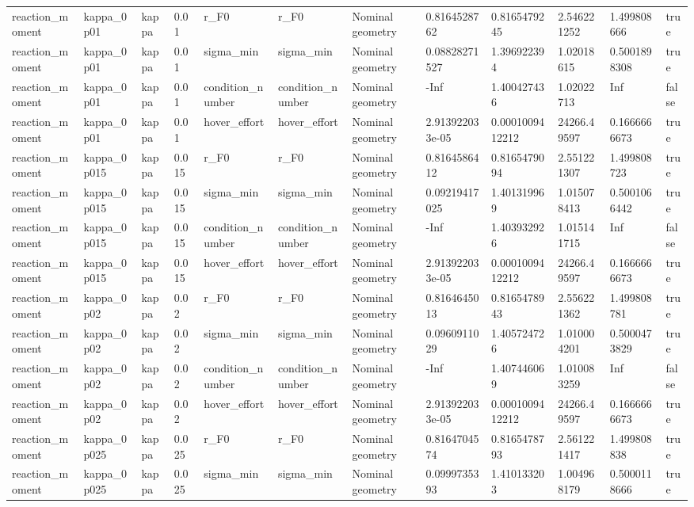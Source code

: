 \begin{tabular}{@{}llllllllllll@{}}
reaction\_moment & kappa\_0p01 & kappa & 0.01 & r\_F0 & r\_F0 & Nominal geometry & 0.8164528762 & 0.8165479245 & 2.546221252 & 1.499808666 & true \\
reaction\_moment & kappa\_0p01 & kappa & 0.01 & sigma\_min & sigma\_min & Nominal geometry & 0.08828271527 & 1.396922394 & 1.02018615 & 0.5001898308 & true \\
reaction\_moment & kappa\_0p01 & kappa & 0.01 & condition\_number & condition\_number & Nominal geometry & -Inf & 1.400427436 & 1.02022713 & Inf & false \\
reaction\_moment & kappa\_0p01 & kappa & 0.01 & hover\_effort & hover\_effort & Nominal geometry & 2.913922033e-05 & 0.0001009412212 & 24266.49597 & 0.1666666673 & true \\
reaction\_moment & kappa\_0p015 & kappa & 0.015 & r\_F0 & r\_F0 & Nominal geometry & 0.8164586412 & 0.8165479094 & 2.551221307 & 1.499808723 & true \\
reaction\_moment & kappa\_0p015 & kappa & 0.015 & sigma\_min & sigma\_min & Nominal geometry & 0.09219417025 & 1.401319969 & 1.015078413 & 0.5001066442 & true \\
reaction\_moment & kappa\_0p015 & kappa & 0.015 & condition\_number & condition\_number & Nominal geometry & -Inf & 1.403932926 & 1.015141715 & Inf & false \\
reaction\_moment & kappa\_0p015 & kappa & 0.015 & hover\_effort & hover\_effort & Nominal geometry & 2.913922033e-05 & 0.0001009412212 & 24266.49597 & 0.1666666673 & true \\
reaction\_moment & kappa\_0p02 & kappa & 0.02 & r\_F0 & r\_F0 & Nominal geometry & 0.8164645013 & 0.8165478943 & 2.556221362 & 1.499808781 & true \\
reaction\_moment & kappa\_0p02 & kappa & 0.02 & sigma\_min & sigma\_min & Nominal geometry & 0.0960911029 & 1.405724726 & 1.010004201 & 0.5000473829 & true \\
reaction\_moment & kappa\_0p02 & kappa & 0.02 & condition\_number & condition\_number & Nominal geometry & -Inf & 1.407446069 & 1.010083259 & Inf & false \\
reaction\_moment & kappa\_0p02 & kappa & 0.02 & hover\_effort & hover\_effort & Nominal geometry & 2.913922033e-05 & 0.0001009412212 & 24266.49597 & 0.1666666673 & true \\
reaction\_moment & kappa\_0p025 & kappa & 0.025 & r\_F0 & r\_F0 & Nominal geometry & 0.8164704574 & 0.8165478793 & 2.561221417 & 1.499808838 & true \\
reaction\_moment & kappa\_0p025 & kappa & 0.025 & sigma\_min & sigma\_min & Nominal geometry & 0.0999735393 & 1.410133203 & 1.004968179 & 0.5000118666 & true \\

\end{tabular}

